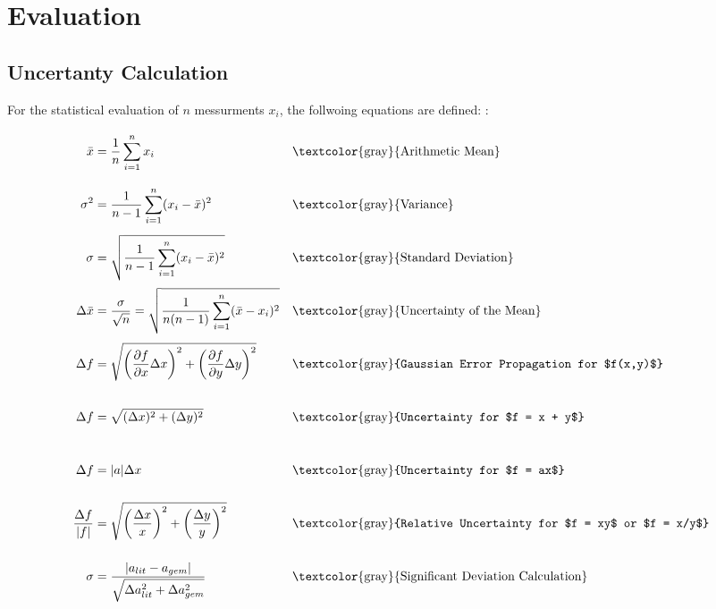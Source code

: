 \chapter{Evaluation}
\label{ch:Auswertung}
\section*{Uncertanty Calculation}
For the statistical evaluation of $n$ messurments $x_i$, the follwoing equations are defined: \cite{errorSkript25}:
\begin{align}
    \bar{x} &= \frac{1}{n} \sum_{i=1}^{n} x_i \vphantom{\sqrt{\sum_i^n}^2} && \text{\textcolor{gray}{Arithmetic Mean}} \label{eq:arithmetic_mean} \\
    \sigma^2 &= \frac{1}{n-1} \sum_{i=1}^{n} (x_i - \bar{x})^2 \vphantom{\sqrt{\sum_i^n}^2} && \text{\textcolor{gray}{Variance}} \label{eq:variance} \\
    \sigma &= \sqrt{\frac{1}{n-1} \sum_{i=1}^{n} (x_i - \bar{x})^2} \vphantom{\sqrt{\sum_i^n}^2} && \text{\textcolor{gray}{Standard Deviation}} \label{eq:standard_deviation} \\
    \Delta \bar{x} &= \frac{\sigma}{\sqrt{n}} = \sqrt{\frac{1}{n(n-1)} \sum_{i=1}^n(\bar x - x_i)^2} \vphantom{\sqrt{\sum_i^n}^2} && \text{\textcolor{gray}{Uncertainty of the Mean}} \label{eq:uncertainty_mean} \\
    \Delta f &= \sqrt{\left(\frac{\partial f}{\partial x} \Delta x\right)^2 + \left(\frac{\partial f}{\partial y} \Delta y\right)^2} \vphantom{\sqrt{\sum_i^n}^2} && \text{\textcolor{gray}{Gaussian Error Propagation for $f(x,y)$}} \label{eq:gauss_error_prop} \\
    \Delta f &= \sqrt{(\Delta x)^2 + (\Delta y)^2} \vphantom{\sqrt{\sum_i^n}^2} && \text{\textcolor{gray}{Uncertainty for $f = x + y$}} \label{eq:error_sum} \\
    \Delta f &= |a| \Delta x \vphantom{\sqrt{\sum_i^n}^2} && \text{\textcolor{gray}{Uncertainty for $f = ax$}} \label{eq:error_proportional} \\
    \frac{\Delta f}{|f|} &= \sqrt{\left(\frac{\Delta x}{x}\right)^2 + \left(\frac{\Delta y}{y}\right)^2} \vphantom{\sqrt{\sum_i^n}^2} && \text{\textcolor{gray}{Relative Uncertainty for $f = xy$ or $f = x/y$}} \label{eq:relative_error} \\
    \sigma &= \frac{|a_{lit} - a_{gem}|}{\sqrt{\Delta a_{lit}^2 + \Delta a_{gem}^2}} \vphantom{\sqrt{\sum_i^n}^2} && \text{\textcolor{gray}{Significant Deviation Calculation}} \label{eq:significant_deviation}
\end{align}

